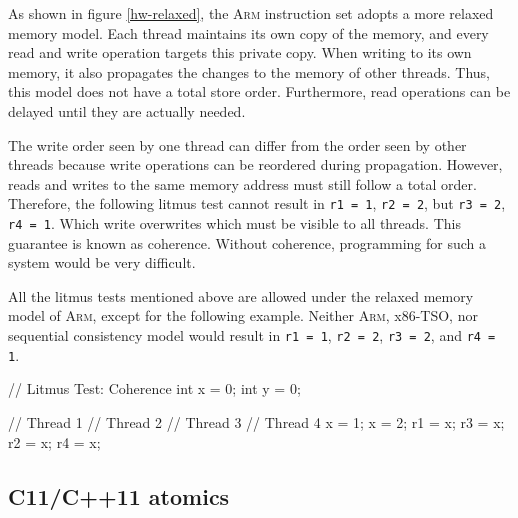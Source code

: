 \documentclass[fontsize=10pt, oneside]{scrartcl}
\newcommand{\monobox}[1]{\mbox{\texttt{#1}}}
\begin{document}
As shown in figure \ref{hw-relaxed}, the \textsc{Arm} instruction set adopts a more relaxed memory model.
Each thread maintains its own copy of the memory, and every read and write operation targets this private copy.
When writing to its own memory, it also propagates the changes to the memory of other threads.
Thus, this model does not have a total store order.
Furthermore, read operations can be delayed until they are actually needed.

The write order seen by one thread can differ from the order seen by other threads because write operations can be reordered during propagation.
However, reads and writes to the same memory address must still follow a total order.
Therefore, the following litmus test cannot result in \monobox{r1 = 1}, \monobox{r2 = 2}, but \monobox{r3 = 2}, \monobox{r4 = 1}.
Which write overwrites which must be visible to all threads.
This guarantee is known as coherence.
Without coherence, programming for such a system would be very difficult.

All the litmus tests mentioned above are allowed under the relaxed memory model of \textsc{Arm}, except for the following example.
Neither \textsc{Arm}, x86-TSO, nor sequential consistency model would result in \monobox{r1 = 1}, \monobox{r2 = 2}, \monobox{r3 = 2}, and \monobox{r4 = 1}.

\begin{ccode}
// Litmus Test: Coherence
int x = 0;
int y = 0;

// Thread 1    // Thread 2    // Thread 3    // Thread 4
x = 1;         x = 2;         r1 = x;        r3 = x;
                              r2 = x;        r4 = x;
\end{ccode}

\subsection{C11/C++11 atomics}
\end{document}
